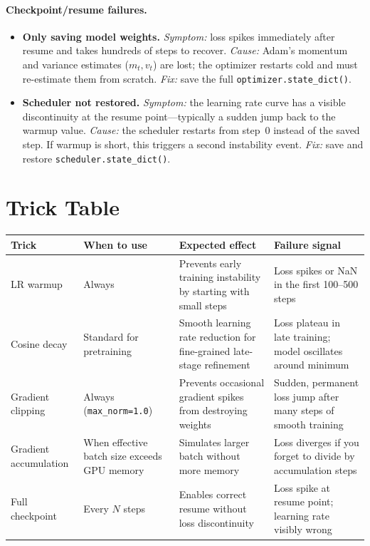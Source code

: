 \paragraph{Checkpoint/resume failures.}

\begin{itemize}
  \item \textbf{Only saving model weights.} \emph{Symptom:} loss spikes immediately after resume and takes hundreds of steps to recover. \emph{Cause:} Adam's momentum and variance estimates ($m_t, v_t$) are lost; the optimizer restarts cold and must re-estimate them from scratch. \emph{Fix:} save the full \texttt{optimizer.state\_dict()}.
  \item \textbf{Scheduler not restored.} \emph{Symptom:} the learning rate curve has a visible discontinuity at the resume point---typically a sudden jump back to the warmup value. \emph{Cause:} the scheduler restarts from step~0 instead of the saved step. If warmup is short, this triggers a second instability event. \emph{Fix:} save and restore \texttt{scheduler.state\_dict()}.
\end{itemize}


\section{Trick Table}

\noindent
\begin{tabularx}{\textwidth}{@{}>{\raggedright\arraybackslash}p{2.8cm}
                              >{\raggedright\arraybackslash}p{2.8cm}
                              >{\raggedright\arraybackslash}p{3.2cm}
                              X@{}}
\toprule
\textbf{Trick} & \textbf{When to use} & \textbf{Expected effect} & \textbf{Failure signal} \\
\midrule
LR warmup &
  Always &
  Prevents early training instability by starting with small steps &
  Loss spikes or NaN in the first 100--500 steps \\[4pt]
Cosine decay &
  Standard for pretraining &
  Smooth learning rate reduction for fine-grained late-stage refinement &
  Loss plateau in late training; model oscillates around minimum \\[4pt]
Gradient clipping &
  Always (\texttt{max\_norm=1.0}) &
  Prevents occasional gradient spikes from destroying weights &
  Sudden, permanent loss jump after many steps of smooth training \\[4pt]
Gradient accumulation &
  When effective batch size exceeds GPU memory &
  Simulates larger batch without more memory &
  Loss diverges if you forget to divide by accumulation steps \\[4pt]
Full checkpoint &
  Every $N$ steps &
  Enables correct resume without loss discontinuity &
  Loss spike at resume point; learning rate visibly wrong \\
\bottomrule
\end{tabularx}


